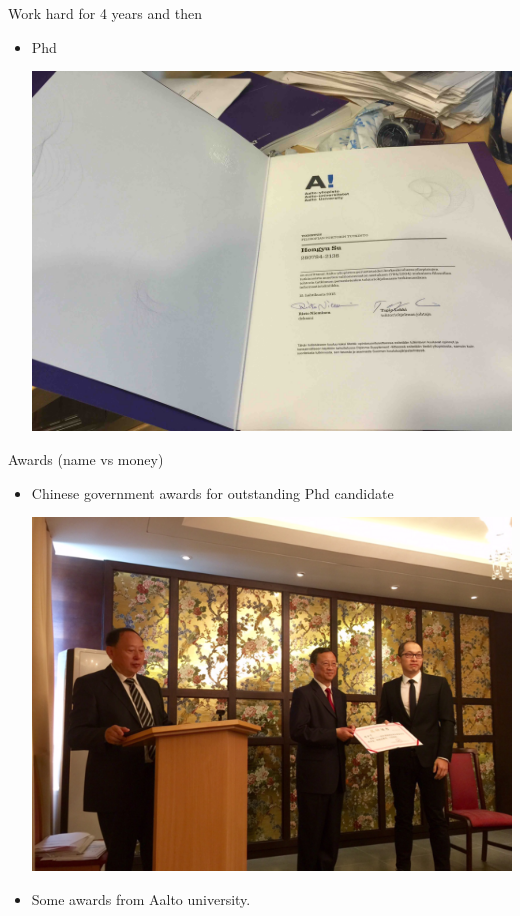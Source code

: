 \documentclass[first=dgreen,second=purple,logo=yellowexc]{aaltoslides}
\begin{document}
\begin{frame}{Work hard for 4 years and then}
\begin{itemize}
\begin{center}
		\end{center}
		\item Phd
		\begin{center}
			\includegraphics[scale=0.02]{./plots/phd.jpg}
		\end{center}
	\end{itemize}
\end{frame}

\begin{frame}{Awards (name vs money)}
	\begin{itemize}
		\item Chinese government awards for outstanding Phd candidate
		\begin{center}
			\includegraphics[scale=0.3]{./plots/awards1.png}
		\end{center}
		\item Some awards from Aalto university.
	\end{itemize}
\end{frame}
\end{document}
